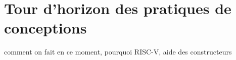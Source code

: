 \chapter{Tour d'horizon des pratiques de conceptions}

comment on fait en ce moment, pourquoi RISC-V, aide des constructeurs